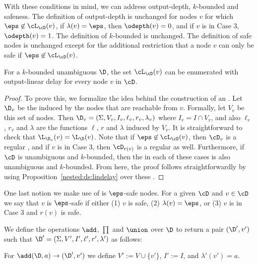 With these conditions in mind, we can address output-depth, $k$-bounded and safeness. The definition of output-depth is unchanged for nodes $v$ for which $\eps\not\in\cL_{\cD}(v)$, if $\lambda(v) = \eps$, then $\odepth(v) = 0$, and if $v$ is in Case 3, $\odepth(v) = 1$. The definition of $k$-bounded is unchanged. The definition of safe nodes is unchanged except for the additional restriction that a node $v$ can only be safe if $\eps\not\in\cL_{\cD}(v)$.
\begin{claim}\label{nested:appendix:eps-enum}
For a $k$-bounded unambiguous \dsepsabbr $\D$, the set $\cL_{\cD}(v)$ can be enumerated with output-linear delay for every node $v$ in $\cD$.
\end{claim}
\begin{proof}
	To prove this, we formalize the idea behind the construction of an \dsepsabbr.
	Let $\D_{v}$ be the \dsepsabbr induced by the nodes that are reachable from $v$. Formally, let $V_v$ be this set of nodes. 
	Then $\D_{v} = (\Sigma, V_v, I_v, \ell_v, r_v, \lambda_v)$ where $I_v = I \cap V_v$, and also $\ell_v$, $r_v$ and $\lambda$ are the functions $\ell$, $r$ and $\lambda$ induced by $V_v$. 
	It is straightforward to check that $\L_{\D_v}(v) = \L_{\D}(v)$.
	Note that if $\eps\not\in\cL_{\cD}(v)$, then $\cD_v$ is a regular \dsabbr, and if $v$ is in Case 3, then $\cD_{r(v)}$ is a regular \dsabbr as well.
	Furthermore, if $\cD$ is unambiguous and $k$-bounded, then the \dsabbr in each of these cases is also unambiguous and $k$-bounded.
	From here, the proof follows straightforwardly by using Proposition~\ref{nested:ds:lindelay} over these \dsabbr.
\end{proof}

One last notion we make use of is $\eps$-safe nodes. For a given \dsepsabbr $\cD$ and $v\in\cD$ we say that $v$ is $\eps$-safe if either (1) $v$ is safe, (2) $\lambda(v) = \eps$, or (3) $v$ is in Case 3 and $r(v)$ is safe.

We define the operations $\add$, $\prod$ and $\union$ over $\D$ to return a pair $(\D',v')$ such that $\D' = (\Sigma, V', I', \ell', r', \lambda')$ as follows:

For $\add(\D,a)\to(\D',v')$ we define $V' := V \cup \{v'\}$, $I' := I$, and $\lambda'(v') = a$.

